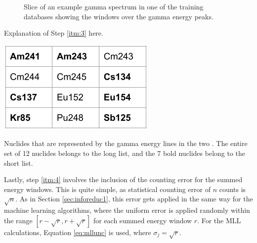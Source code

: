 \begin{figure}[!htb]
  \caption{Slice of an example gamma spectrum in one of the training databases
           showing the windows over the gamma energy peaks.}
  \label{fig:enwindows}
\end{figure}

Explanation of Step \ref{itm:3} here. 

\begin{table}[!htb]
  \centering
  \includegraphics[width=0.4\linewidth]{./chapters/exp2/enlist_nucs.png}
  \caption{Nuclides that are represented by the gamma energy lines in the two . The entire 
           set of 12 nuclides belongs to the long list, and the 7 bold nuclides
           belong to the short list.}
  \label{tbl:enlistnucs}
\end{table}

Lastly, step \ref{itm:4} involves the inclusion of the counting error for the
summed energy windows. This is quite simple, as statistical counting error of
$n$ counts is $\sqrt{n}$.  As in Section \ref{sec:inforeduc1}, this error gets
applied in the same way for the machine learning algorithms, where the uniform
error is applied randomly within the range $[r-\sqrt{r},r+\sqrt{r}]$ for each
summed energy window $r$. For the \gls{MLL} calculations, Equation
\ref{eq:mllunc} is used, where $\sigma_{j} = \sqrt{r}$.  
